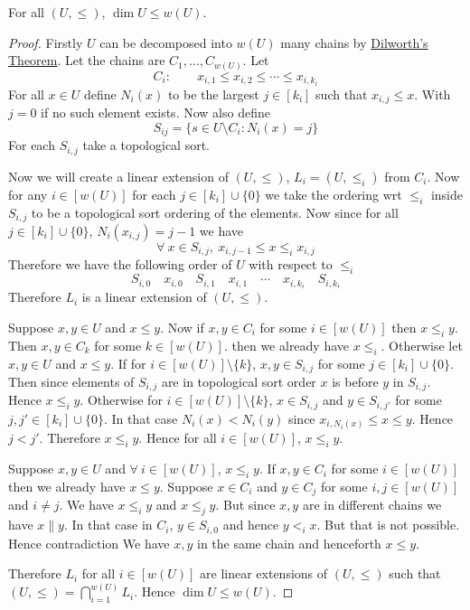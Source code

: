 \begin{Theorem}{}{}
	For all $(U,\leq)$, $\dim U\leq w(U)$.
\end{Theorem}
\begin{proof}
	Firstly $U$ can be decomposed into $w(U)$ many chains by \hyperref[th:dilworth]{Dilworth's Theorem}. Let the chains are $C_1,\dots, C_{w(U)}$. Let $$C_i:\qquad x_{i,1}\leq x_{i,2}\leq\cdots\leq x_{i,k_i}$$For all $x\in U$ define $N_i(x)$ to be the largest $j\in[k_i]$ such that $x_{i,j}\leq x$. With $j=0$ if no such element exists. Now also define $$S_{ij}=\{s\in U\setminus C_i\colon N_i(x)=j\}$$For each $S_{i,j}$ take a topological sort. 
	
	Now we will create a linear extension of $(U,\leq )$, $L_i=(U,\leq_i)$ from $C_i$. Now for any $i\in[w(U)]$ for each $j\in[k_i]\cup\{0\}$ we take the ordering wrt $\leq_i$ inside $S_{i,j}$ to be a topological sort ordering of the elements. Now	since for all $j\in[k_i]\cup\{0\}$, $N_i(x_{i,j})=j-1$ we have $$\forall\ x\in S_{i,j},\ x_{i,j-1}\leq x\leq_i x_{i,j}$$ Therefore we have the following order of $U$ with respect to $\leq_i$ $$S_{i,0}\quad x_{i,0} \quad S_{i,1}\quad x_{i,1}\quad\cdots\quad x_{i,k_i}\quad S_{i,k_i}$$Therefore $L_i$ is a linear extension of $(U,\leq)$. 
	
		Suppose $x,y\in U$ and $x\leq y$. Now if $x,y\in C_i$ for some $i\in [w(U)]$ then $x\leq_i y$. Then $x,y\in C_k$ for some $k\in[w(U)]$. then we already have $x\leq_i$. Otherwise let $x,y\in U$ and $x\leq y$. If for $i\in[w(U)]\setminus\{k\}$, $x,y\in S_{i,j}$ for some $j\in[k_i]\cup\{0\}$.  Then since elements of $S_{i,j}$ are in topological sort order $x$ is before $y$ in $S_{i,j}$. Hence $x\leq_i y$. Otherwise for $i\in [w(U)]\setminus\{k\}$, $x\in S_{i,j}$ and $y\in S_{i,j'}$ for some $j,j'\in[k_i]\cup\{0\}$. In that case $N_i(x)< N_i(y)$ since $x_{i,N_i(x)}\leq x\leq y$. Hence $j<j'$. Therefore $x\leq_i y$. Hence for all $i\in[w(U)]$, $x\leq_i y$. 
	
	Suppose $x,y\in U$ and $\forall\ i\in[w(U)]$, $x\leq_i y$. If $x,y\in C_i$ for some $i\in[w(U)]$ then we already have $x\leq y$. Suppose $x\in C_i$ and $y\in C_j$ for some $i,j\in[w(U)]$ and $i\neq j$. We have $x\leq_i y$ and $x\leq_j y$. But since $x,y$ are in different chains we have $x\| y$. In that case in $C_i$, $y\in S_{i,0}$ and hence $y<_i x$. But that is not possible. Hence contradiction \ctr We have $x,y$ in the same chain and henceforth $x\leq y$. 
	
	Therefore $L_i$ for all $i\in [w(U)]$ are linear extensions of $(U,\leq)$ such that  $(U,\leq)=\bigcap\limits_{i=1}^{w(U)}L_i$. Hence $\dim U\leq w(U)$. 
\end{proof}

